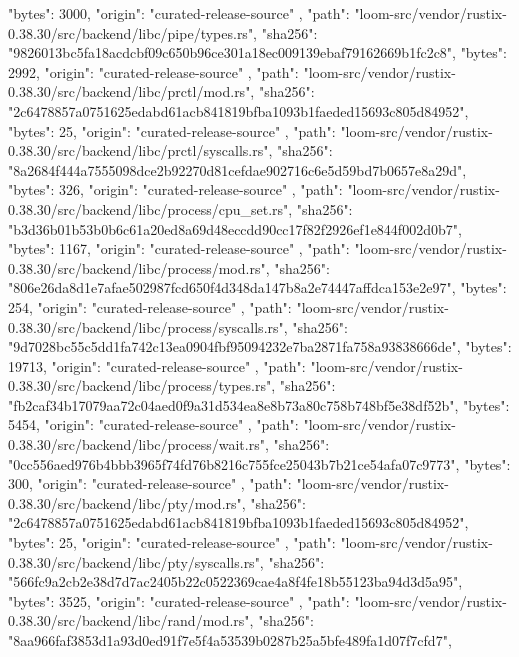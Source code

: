 {{      "bytes": 3000,
      "origin": "curated-release-source"
    },
    {
      "path": "loom-src/vendor/rustix-0.38.30/src/backend/libc/pipe/types.rs",
      "sha256": "9826013bc5fa18acdcbf09c650b96ce301a18ec009139ebaf79162669b1fc2c8",
      "bytes": 2992,
      "origin": "curated-release-source"
    },
    {
      "path": "loom-src/vendor/rustix-0.38.30/src/backend/libc/prctl/mod.rs",
      "sha256": "2c6478857a0751625edabd61acb841819bfba1093b1faeded15693c805d84952",
      "bytes": 25,
      "origin": "curated-release-source"
    },
    {
      "path": "loom-src/vendor/rustix-0.38.30/src/backend/libc/prctl/syscalls.rs",
      "sha256": "8a2684f444a7555098dce2b92270d81cefdae902716c6e5d59bd7b0657e8a29d",
      "bytes": 326,
      "origin": "curated-release-source"
    },
    {
      "path": "loom-src/vendor/rustix-0.38.30/src/backend/libc/process/cpu_set.rs",
      "sha256": "b3d36b01b53b0b6c61a20ed8a69d48eccdd90cc17f82f2926ef1e844f002d0b7",
      "bytes": 1167,
      "origin": "curated-release-source"
    },
    {
      "path": "loom-src/vendor/rustix-0.38.30/src/backend/libc/process/mod.rs",
      "sha256": "806e26da8d1e7afae502987fcd650f4d348da147b8a2e74447affdca153e2e97",
      "bytes": 254,
      "origin": "curated-release-source"
    },
    {
      "path": "loom-src/vendor/rustix-0.38.30/src/backend/libc/process/syscalls.rs",
      "sha256": "9d7028bc55c5dd1fa742c13ea0904fbf95094232e7ba2871fa758a93838666de",
      "bytes": 19713,
      "origin": "curated-release-source"
    },
    {
      "path": "loom-src/vendor/rustix-0.38.30/src/backend/libc/process/types.rs",
      "sha256": "fb2caf34b17079aa72c04aed0f9a31d534ea8e8b73a80c758b748bf5e38df52b",
      "bytes": 5454,
      "origin": "curated-release-source"
    },
    {
      "path": "loom-src/vendor/rustix-0.38.30/src/backend/libc/process/wait.rs",
      "sha256": "0cc556aed976b4bbb3965f74fd76b8216c755fce25043b7b21ce54afa07c9773",
      "bytes": 300,
      "origin": "curated-release-source"
    },
    {
      "path": "loom-src/vendor/rustix-0.38.30/src/backend/libc/pty/mod.rs",
      "sha256": "2c6478857a0751625edabd61acb841819bfba1093b1faeded15693c805d84952",
      "bytes": 25,
      "origin": "curated-release-source"
    },
    {
      "path": "loom-src/vendor/rustix-0.38.30/src/backend/libc/pty/syscalls.rs",
      "sha256": "566fc9a2cb2e38d7d7ac2405b22c0522369cae4a8f4fe18b55123ba94d3d5a95",
      "bytes": 3525,
      "origin": "curated-release-source"
    },
    {
      "path": "loom-src/vendor/rustix-0.38.30/src/backend/libc/rand/mod.rs",
      "sha256": "8aa966faf3853d1a93d0ed91f7e5f4a53539b0287b25a5bfe489fa1d07f7cfd7",
}}
